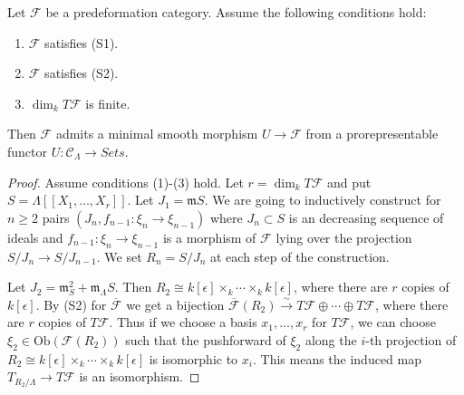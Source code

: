 \begin{lemma}
\label{lemma-miniversal-object-existence-2}
Let $\mathcal{F}$ be a predeformation category.  Assume the following conditions 
hold:
\begin{enumerate}
\item $\mathcal{F}$ satisfies (S1).
\item $\mathcal{F}$ satisfies (S2).
\item $\dim_{k} T\mathcal{F}$ is finite.
\end{enumerate}
Then $\mathcal{F}$ admits a minimal smooth morphism $U \to \mathcal{F}$ 
from a prorepresentable functor $U: \mathcal{C}_\Lambda \to 
\textit{Sets}$.
\end{lemma}

\begin{proof}
Assume conditions (1)-(3) hold.  Let $r = \dim_{k} T\mathcal{F}$ and put $S = 
\Lambda[[X_1, \dots, X_r]]$.  Let $J_{1} = \mathfrak{m}{S}$.  We are going to 
inductively construct for $n \geq 2$ pairs $(J_{n}, f_{n-1}: \xi_{n} 
\to \xi_{n-1})$ where $J_{n} \subset S$ is an decreasing sequence of 
ideals and $f_{n-1}: \xi_{n} \to \xi_{n-1}$ is a morphism of $\mathcal 
F$ lying over the projection $S/J_{n} \to S/J_{n-1}$.  We set $R_{n} = 
S/J_{n}$ at each step of the construction.  

\medskip \noindent
Let $J_{2} = \mathfrak{m}_{S}^2 + \mathfrak{m}_\Lambda S$.  Then $R_2 \cong 
k[\epsilon] \times_{k} \cdots \times_{k} k[\epsilon]$, where there are 
$r$ copies of $k[\epsilon]$.  By (S2) for $\overline{\mathcal{F}}$ we get a 
bijection $\overline{\mathcal{F}}(R_2) \xrightarrow{\sim} T \mathcal{F} \oplus 
\cdots \oplus T \mathcal{F}$, where there are $r$ copies of $T\mathcal{F}$.
Thus if we choose a basis $x_1, \dots, x_r$ for $T\mathcal{F}$, we can choose 
$\xi_{2} \in \text{Ob}(\mathcal{F}(R_2))$ such that the pushforward of 
$\xi_{2}$ along the $i$-th projection of $R_2 \cong k[\epsilon] \times_{k} 
\cdots \times_{k} k[\epsilon]$ is isomorphic to $x_i$.  This means the 
induced map $T_{R_{2}/\Lambda} \to T\mathcal{F}$ is an isomorphism.


\end{proof}
